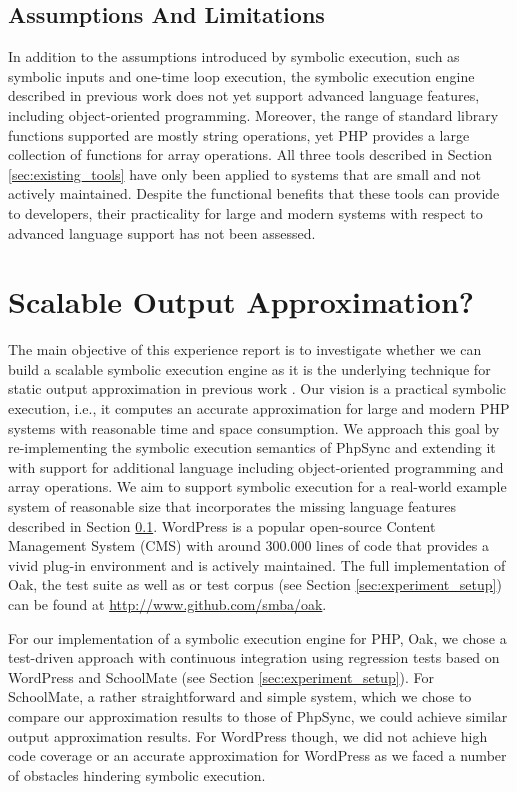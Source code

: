 \documentclass[sigconf]{acmart}
\renewcommand{\sf}[1]{\textsf{#1}}
\begin{document}
\subsection{Assumptions And Limitations}\label{sec:limitations}
In addition to the assumptions introduced by symbolic execution, such as
symbolic inputs and one-time loop execution, the symbolic execution
engine described in previous work \cite{Nguyen:2014:BCG:2635868.2635928} does
not yet support advanced language features, including object-oriented
programming.
Moreover, the range of standard library functions supported are mostly string operations, yet PHP
provides a large collection of functions for array operations.
All three tools described in Section \ref{sec:existing_tools} have
only been applied to systems that are small and not actively maintained.
Despite the functional benefits that these tools can provide to developers,
their practicality for large and modern systems with respect to advanced language support has not been
assessed.

\section{Scalable Output Approximation?} \label{sec:3}
The main objective of this experience report is to investigate whether we can
build a scalable symbolic execution engine as it is the underlying technique
for static output approximation in previous work
\cite{Nguyen:2011:AFH:2190078.2190142,Nguyen:2014:BCG:2635868.2635928,Nguyen:2015:CPS:2786805.2786872,Nguyen:2015:VIS:2819009.2819140}.
Our vision is a practical symbolic execution, i.e., it computes an accurate
approximation for large and modern PHP systems with reasonable time and space consumption.
We approach this goal by re-implementing the symbolic execution semantics  of
\sf{PhpSync} \cite{Nguyen:2014:BCG:2635868.2635928} and extending it with support for additional language
including object-oriented programming and array operations. We aim to support symbolic
execution for a real-world example system of reasonable size that incorporates
the missing language features described in Section \ref{sec:limitations}.
\textsf{WordPress} is a popular open-source Content Management System (CMS)
with around 300.000 lines of code that provides a vivid
plug-in environment and is actively maintained. The full implementation of
\sf{Oak}, the test suite as well as or test corpus (see Section \ref{sec:experiment_setup}) can be found at
\url{http://www.github.com/smba/oak}.

For our implementation of a symbolic execution engine for PHP, \sf{Oak}, we
chose a test-driven approach with continuous integration using regression tests
based on \sf{WordPress} and \sf{SchoolMate} (see Section
\ref{sec:experiment_setup}). For \sf{SchoolMate}, a rather straightforward and
simple system, which we chose to compare our approximation results to those of
\sf{PhpSync}, we could achieve similar output approximation results. For
\sf{WordPress} though, we did not achieve high code coverage or an accurate
approximation for \sf{WordPress} as we faced a number of obstacles hindering
symbolic execution.
\end{document}
